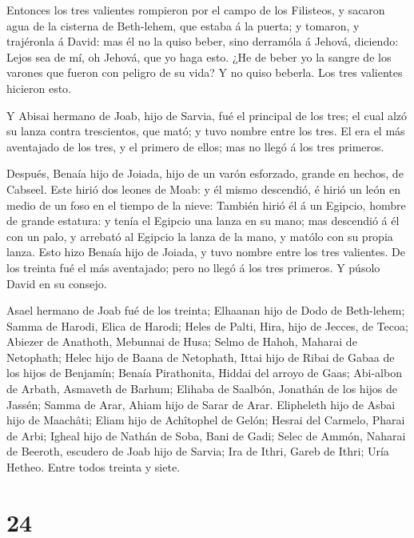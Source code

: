  Entonces los tres valientes rompieron por el campo de los
Filisteos, y sacaron agua de la cisterna de Beth-lehem, que estaba á la
puerta; y tomaron, y trajéronla á David: mas él no la quiso beber, sino
derramóla á Jehová, diciendo:  Lejos sea de mí, oh Jehová,
que yo haga esto. ¿He de beber yo la sangre de los varones que fueron
con peligro de su vida? Y no quiso beberla. Los tres valientes hicieron
esto.

 Y Abisai hermano de Joab, hijo de Sarvia, fué el principal
de los tres; el cual alzó su lanza contra trescientos, que mató; y tuvo
nombre entre los tres.  El era el más aventajado de los
tres, y el primero de ellos; mas no llegó á los tres primeros.

 Después, Benaía hijo de Joiada, hijo de un varón
esforzado, grande en hechos, de Cabseel. Este hirió dos leones de Moab:
y él mismo descendió, é hirió un león en medio de un foso en el tiempo
de la nieve:  También hirió él á un Egipcio, hombre de
grande estatura: y tenía el Egipcio una lanza en su mano; mas descendió
á él con un palo, y arrebató al Egipcio la lanza de la mano, y matólo
con su propia lanza.  Esto hizo Benaía hijo de Joiada, y
tuvo nombre entre los tres valientes.  De los treinta fué
el más aventajado; pero no llegó á los tres primeros. Y púsolo David en
su consejo.

 Asael hermano de Joab fué de los treinta; Elhaanan hijo de
Dodo de Beth-lehem;  Samma de Harodi, Elica de Harodi;
 Heles de Palti, Hira, hijo de Jecces, de Tecoa;
 Abiezer de Anathoth, Mebunnai de Husa;  Selmo
de Hahoh, Maharai de Netophath;  Helec hijo de Baana de
Netophath, Ittai hijo de Ribai de Gabaa de los hijos de Benjamín;
 Benaía Pirathonita, Hiddai del arroyo de Gaas;
 Abi-albon de Arbath, Asmaveth de Barhum; 
Elihaba de Saalbón, Jonathán de los hijos de Jassén;  Samma
de Arar, Ahiam hijo de Sarar de Arar.  Elipheleth hijo de
Asbai hijo de Maachâti; Eliam hijo de Achîtophel de Gelón; 
Hesrai del Carmelo, Pharai de Arbi;  Igheal hijo de Nathán
de Soba, Bani de Gadi;  Selec de Ammón, Naharai de Beeroth,
escudero de Joab hijo de Sarvia;  Ira de Ithri, Gareb de
Ithri;  Uría Hetheo. Entre todos treinta y siete.

\hypertarget{section-23}{%
\section{24}\label{section-23}}

